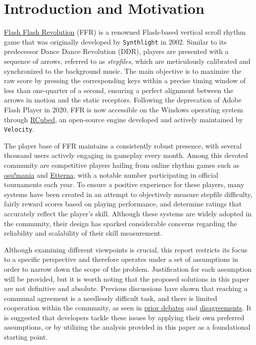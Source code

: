 \section{Introduction and Motivation}
\label{sec:introduction}

\href{https://www.Flash Flash Revolution.com/}{Flash Flash Revolution} (FFR) is a renowned Flash-based vertical scroll rhythm game that was originally developed by \texttt{Synthlight} in 2002. Similar to its predecessor Dance Dance Revolution (DDR), players are presented with a sequence of arrows, referred to as \textit{stepfiles}, which are meticulously calibrated and synchronized to the background music. The main objective is to maximize the raw score by pressing the corresponding keys within a precise timing window of less than one-quarter of a second, ensuring a perfect alignment between the arrows in motion and the static receptors. Following the deprecation of Adobe Flash Player in 2020, FFR is now accessible on the Windows operating system through \href{https://www.flashflashrevolution.com/ffr/r3-goes-open-source/}{RCubed}, an open-source engine developed and actively maintained by \texttt{Velocity}.

\vspace{2mm}

The player base of FFR maintains a consistently robust presence, with several thousand users actively engaging in gameplay every month. Among this devoted community are competitive players hailing from online rhythm games such as \href{https://osu.ppy.sh/}{osu!mania} and \href{https://etternaonline.com/}{Etterna}, with a notable number participating in official tournaments each year. To ensure a positive experience for these players, many systems have been created in an attempt to objectively measure stepfile difficulty, fairly reward scores based on playing performance, and determine ratings that accurately reflect the player's skill. Although these systems are widely adopted in the community, their design has sparked considerable concerns regarding the reliability and scalability of their skill measurement.

\vspace{2mm}

Although examining different viewpoints is crucial, this report restricts its focus to a specific perspective and therefore operates under a set of assumptions in order to narrow down the scope of the problem. Justification for each assumption will be provided, but it is worth noting that the proposed solutions in this paper are not definitive and absolute. 
Previous discussions have shown that reaching a communal agreement is a needlessly difficult task, and there is limited cooperation within the community, as seen in \href{https://www.flashflashrevolution.com/vbz/showthread.php?t=153119}{prior debates} and \href{https://www.flashflashrevolution.com/vbz/showthread.php?t=149402}{disagreements}. It is suggested that developers tackle these issues by applying their own preferred assumptions, or by utilizing the analysis provided in this paper as a foundational starting point.

